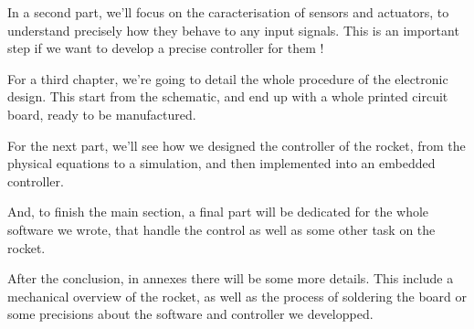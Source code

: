 In a second part, we'll focus on the caracterisation of sensors and actuators, to understand precisely how they behave to
any input signals. This is an important step if we want to develop a precise controller for them !

For a third chapter, we're going to detail the whole procedure of the electronic design. This start from the schematic,
and end up with a whole printed circuit board, ready to be manufactured.

For the next part, we'll see how we designed the controller of the rocket, from the physical equations to a simulation,
and then implemented into an embedded controller.

And, to finish the main section, a final part will be dedicated for the whole software we wrote, that handle the control as
well as some other task on the rocket.

After the conclusion, in annexes there will be some more details. This include a mechanical overview of the rocket, as well as
the process of soldering the board or some precisions about the software and controller we developped.

